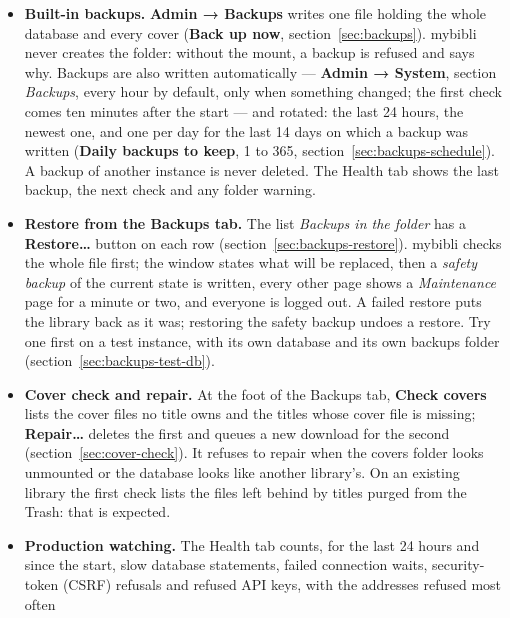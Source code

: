 \begin{itemize}
  \item \textbf{Built-in backups.} \textbf{Admin → Backups} writes one
        file holding the whole database and every cover
        (\textbf{Back up now}, section~\ref{sec:backups}). mybibli never
        creates the folder: without the mount, a backup is refused and
        says why. Backups are also written automatically ---
        \textbf{Admin → System}, section \emph{Backups}, every hour by
        default, only when something changed; the first check comes ten
        minutes after the start --- and rotated: the last 24 hours, the
        newest one, and one per day for the last 14 days on which a
        backup was written (\textbf{Daily backups to keep}, 1 to 365,
        section~\ref{sec:backups-schedule}). A backup of another
        instance is never deleted. The Health tab shows the last
        backup, the next check and any folder warning.
  \item \textbf{Restore from the Backups tab.} The list \emph{Backups in
        the folder} has a \textbf{Restore…} button on each row
        (section~\ref{sec:backups-restore}). mybibli checks the whole
        file first; the window states what will be replaced, then a
        \emph{safety backup} of the current state is written, every
        other page shows a \emph{Maintenance} page for a minute or two,
        and everyone is logged out. A failed restore puts the library
        back as it was; restoring the safety backup undoes a restore.
        Try one first on a test instance, with its own database and its own
        backups folder (section~\ref{sec:backups-test-db}).
  \item \textbf{Cover check and repair.} At the foot of the Backups tab,
        \textbf{Check covers} lists the cover files no title owns and
        the titles whose cover file is missing; \textbf{Repair…} deletes
        the first and queues a new download for the second
        (section~\ref{sec:cover-check}). It refuses to repair when the
        covers folder looks unmounted or the database looks like
        another library's. On an existing library the first check
        lists the files left behind by titles purged from the Trash:
        that is expected.
  \item \textbf{Production watching.} The Health tab counts, for the
        last 24 hours and since the start, slow database statements,
        failed connection waits, security-token (CSRF) refusals and
        refused API keys, with the addresses refused most often

\end{itemize}
